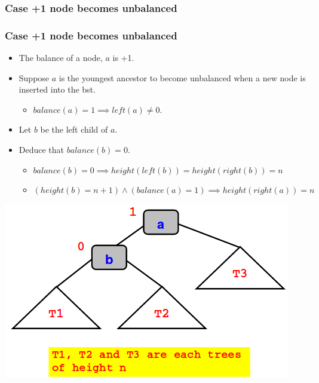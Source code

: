 \documentclass{beamer}
\begin{document}
\subsubsection{Case +1 node becomes unbalanced}
\begin{frame}
\frametitle{Case +1 node becomes unbalanced}
\begin{itemize}
\item The balance of a node, $a$ is +1.
\item Suppose $a$ is the youngest ancestor to become unbalanced when a new node is inserted into the bst.
\begin{itemize}
\item $balance(a) = 1 \implies left(a) \neq 0$.
\end{itemize}
\item Let $b$ be the left child of $a$.
\item Deduce that $balance(b) = 0$.
\begin{itemize}
\item $balance(b) = 0 \implies height(left(b)) = height(right(b)) = n$
\item $(height(b) = n+1) \land (balance(a)=1) \implies height(right(a)) = n$
\end{itemize}
\end{itemize}
\includegraphics[scale=0.25]{balance.png}
\end{frame}
\end{document}
